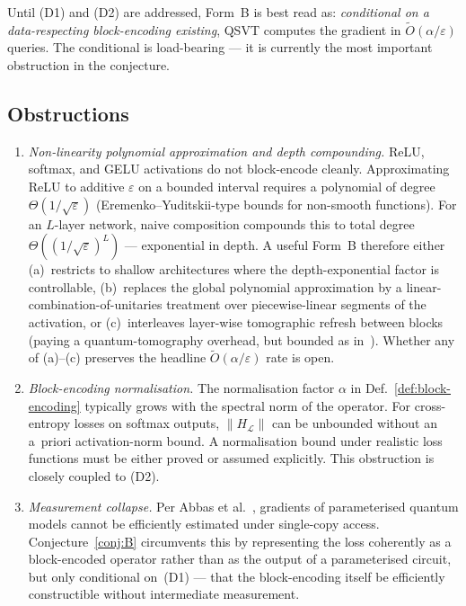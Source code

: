 \documentclass[11pt,a4paper]{article}
\theoremstyle{definition}
\newcommand{\Otil}{\widetilde{O}}
\newcommand{\veps}{\varepsilon}
\newcommand{\loss}{\mathcal{L}}
\begin{document}
Until (D1) and (D2) are addressed, Form~B is best read as: \emph{conditional on a data-respecting block-encoding existing}, QSVT computes the gradient in $\Otil(\alpha/\veps)$ queries. The conditional is load-bearing --- it is currently the most important obstruction in the conjecture.

\subsection{Obstructions}

\begin{enumerate}[label=(O\arabic*),itemsep=0pt,start=4]
\item \emph{Non-linearity polynomial approximation and depth compounding.} ReLU, softmax, and GELU activations do not block-encode cleanly. Approximating ReLU to additive $\veps$ on a bounded interval requires a polynomial of degree $\Theta(1/\sqrt{\veps})$ (Eremenko--Yuditskii-type bounds for non-smooth functions). For an $L$-layer network, naive composition compounds this to total degree $\Theta((1/\sqrt{\veps})^L)$ --- exponential in depth. A useful Form~B therefore either (a)~restricts to shallow architectures where the depth-exponential factor is controllable, (b)~replaces the global polynomial approximation by a linear-combination-of-unitaries treatment over piecewise-linear segments of the activation, or (c)~interleaves layer-wise tomographic refresh between blocks (paying a quantum-tomography overhead, but bounded as in~\cite{AbbasEtAl2023}). Whether any of (a)--(c) preserves the headline $\Otil(\alpha/\veps)$ rate is open.
\item \emph{Block-encoding normalisation.} The normalisation factor $\alpha$ in Def.~\ref{def:block-encoding} typically grows with the spectral norm of the operator. For cross-entropy losses on softmax outputs, $\|H_\loss\|$ can be unbounded without an a~priori activation-norm bound. A normalisation bound under realistic loss functions must be either proved or assumed explicitly. This obstruction is closely coupled to (D2).
\item \emph{Measurement collapse.} Per Abbas et al.~\cite{AbbasEtAl2023}, gradients of parameterised quantum models cannot be efficiently estimated under single-copy access. Conjecture~\ref{conj:B} circumvents this by representing the loss coherently as a block-encoded operator rather than as the output of a parameterised circuit, but only conditional on~(D1) --- that the block-encoding itself be efficiently constructible without intermediate measurement.
\end{enumerate}
\end{document}
